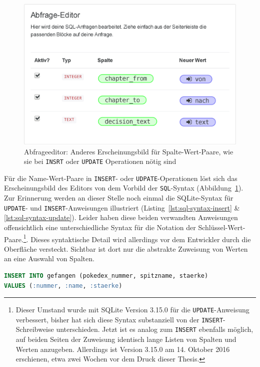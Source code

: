 \begin{figure}[h]
  \includegraphics[width=\textwidth]{images/sql-insert-key-value-pairs}
  \caption{Abfrageeditor: Anderes Erscheinungsbild für Spalte-Wert-Paare, wie sie bei \texttt{INSRT} oder \texttt{UPDATE} Operationen nötig sind}
  \label{fig:screen-sql-editor-insert-key-value-pairs}
\end{figure}

Für die Name-Wert-Paare in \texttt{INSERT}- oder \texttt{UDPATE}-Operationen löst sich das Erscheinungsbild des Editors von dem Vorbild der \texttt{SQL}-Syntax (Abbildung~\ref{fig:screen-sql-editor-insert-key-value-pairs}). Zur Erinnerung werden an dieser Stelle noch einmal die SQLite-Syntax für \texttt{UPDATE}- und \texttt{INSERT}-Anweisungen illustriert (Listing~\ref{lst:sql-syntax-insert} \& \ref{lst:sql-syntax-update}). Leider haben diese beiden verwandten Anweisungen offensichtlich eine unterschiedliche Syntax für die Notation der Schlüssel-Wert-Paare.\footnote{Dieser Umstand wurde mit SQLite Version 3.15.0 für die \texttt{UPDATE}-Anweisung verbessert, bisher hat sich diese Syntax substanziell von der \texttt{INSERT}-Schreibweise unterschieden. Jetzt ist es analog zum \texttt{INSERT} ebenfalls möglich, auf beiden Seiten der Zuweisung identisch lange Listen von Spalten und Werten anzugeben. Allerdings ist Version 3.15.0 am 14. Oktober 2016 erschienen, etwa zwei Wochen vor dem Druck dieser Thesis.}. Dieses syntaktische Detail wird allerdings vor dem Entwickler durch die Oberfläche versteckt. Sichtbar ist dort nur die abstrakte Zuweisung von Werten an eine Auswahl von Spalten.

\begin{lstlisting}[language=SQL,float=h!,caption={Syntax einer \texttt{INSERT}-Anweisung}, label={lst:sql-syntax-insert}]
INSERT INTO gefangen (pokedex_nummer, spitzname, staerke)
VALUES (:nummer, :name, :staerke)
\end{lstlisting}

